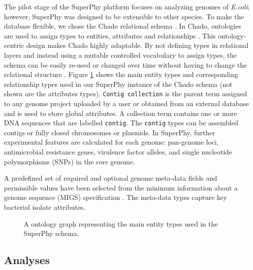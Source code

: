 \documentclass[a4paper,twoside]{article}
\begin{document}
The pilot stage of the SuperPhy platform focuses on analyzing genomes of \textit{E.coli}; however, SuperPhy was designed to be extensible to other species. To make the database flexible, we chose the Chado relational schema \cite{mungall2007chado}. In Chado, ontologies are used to assign types to entities, attributes and relationships \cite{mungall2007chado}. This ontology-centric design makes Chado highly adaptable. By not defining types in relational layers and instead using a mutable controlled vocabulary to assign types, the schema can be easily re-used or changed over time without having to change the relational structure \cite{mungall2007chado}.  Figure \ref{fig:ontology} shows the main entity types and corresponding relationship types used in our SuperPhy instance of the Chado schema (not shown are the attributes types). \texttt{Contig collection} is the parent term assigned to any genome project uploaded by a user or obtained from an external database and is used to store global attributes. A collection term contains one or more DNA sequences that are labelled \texttt{contig}. The \texttt{contig} types can be assembled contigs or fully closed chromosomes or plasmids. In SuperPhy, further experimental features are calculated for each genome: pan-genome loci, antimicrobial resistance genes, virulence factor alleles, and single nucleotide polymorphisms (SNPs) in the core genome.

A predefined set of required and optional genome meta-data fields and permissible values have been selected from the minimum information about a genome sequence (MIGS) specification \cite{field2008}. The meta-data types capture key bacterial isolate attributes.

\begin{figure}[t]
  \centering
   {}
  \vspace{0.2cm}
  \caption{A ontology graph representing the main entity types used in the SuperPhy schema.}
  \label{fig:ontology}
\end{figure}

\subsection{Analyses}
\label{sec:pipeline}
\end{document}

